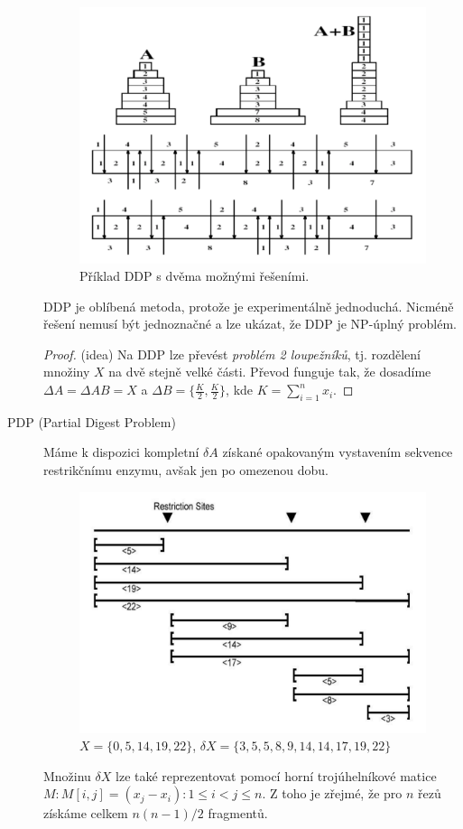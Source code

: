 \documentclass[11pt]{report} %
\numberwithin{equation}{section}
\begin{document}
\begin{description}
	\begin{figure}[H]
		\centering
		\includegraphics[scale=1]{img/ddp.png}
		\caption{Příklad DDP s dvěma možnými řešeními.}
	\end{figure}
	DDP je oblíbená metoda, protože je experimentálně jednoduchá. Nicméně řešení nemusí být jednoznačné a lze ukázat, že DDP je NP-úplný problém.
	\begin{proof}(idea)
		Na DDP lze převést \textit{problém 2 loupežníků}, tj. rozdělení množiny $X$ na dvě stejně velké části. Převod funguje tak, že dosadíme $\Delta A = \Delta AB = X$ a $\Delta B = \{\frac{K}{2}, \frac{K}{2}\}$, kde $K = \sum_{i=1}^{n}x_i$.
	\end{proof}
	\item[PDP (Partial Digest Problem)] Máme k dispozici kompletní $\delta A$ získané opakovaným vystavením sekvence restrikčnímu enzymu, avšak jen po omezenou dobu. 
	\begin{figure}[H]
		\centering
		\includegraphics[scale=1]{img/pdp.png}
		\caption{$X = \{0,5,14,19,22\}$, $\delta X = \{3, 5, 5, 8, 9, 14, 14, 17, 19, 22\}$}
	\end{figure}
	Množinu $\delta X$ lze také reprezentovat pomocí horní trojúhelníkové matice $M : M[i,j] = (x_j - x_i) : 1 \leq i < j \leq n$. Z toho je zřejmé, že pro $n$ řezů získáme celkem $n(n-1)/2$ fragmentů.
	

\end{description}
\end{document}
